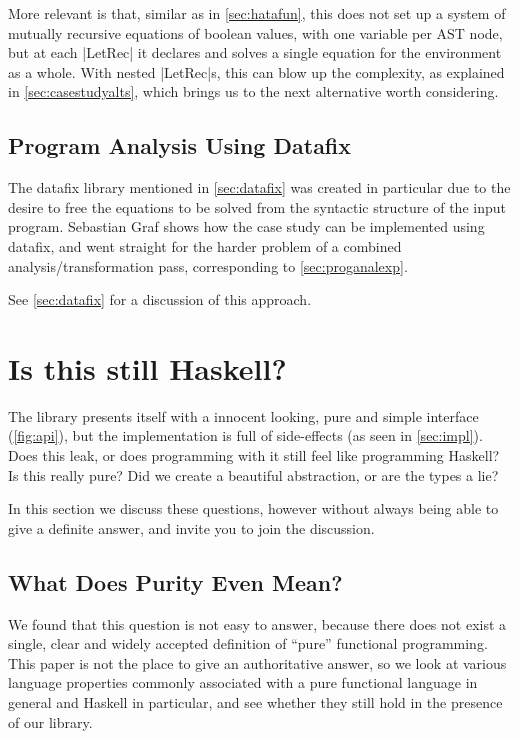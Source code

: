 \documentclass[manuscript,screen,acmsmall,nonacm]{acmart}
\newif\ifpure
\begin{document}
More relevant is that, similar as in \cref{sec:hatafun}, this does not set up a system of mutually recursive equations of boolean values, with one variable per AST node, but at each |LetRec| it declares and solves a single equation for the environment as a whole. With nested |LetRec|s, this can blow up the complexity, as explained in \cref{sec:casestudyalts}, which brings us to the next alternative worth considering.


\subsection{Program Analysis Using Datafix}\label{sec:datafix-code}

The datafix library mentioned in \cref{sec:datafix} was created in particular due to the desire to free the equations to be solved from the syntactic structure of the input program. Sebastian Graf shows how the case study can be implemented using datafix, and went straight for the harder problem of a combined analysis/transformation pass, corresponding to \cref{sec:proganalexp}.


See \cref{sec:datafix} for a discussion of this approach.


\ifpure
\section{Is this still Haskell?}\label{sec:pure}

The library presents itself with a innocent looking, pure and simple interface (\cref{fig:api}), but the implementation is full of side-effects (as seen in \cref{sec:impl}).
Does this leak, or does programming with it still feel like programming Haskell?
Is this really pure? Did we create a beautiful abstraction, or are the types a lie?

In this section we discuss these questions, however without always being able to give a definite answer, and invite you to join the discussion.

\subsection{What Does Purity Even Mean?}

We found that this question is not easy to answer, because there does not exist a single, clear and widely accepted definition of “pure” functional programming.
This paper is not the place to give an authoritative answer, so we look at various language properties commonly associated with a pure functional language in general and Haskell in particular,
and see whether they still hold in the presence of our library.
\end{document}
